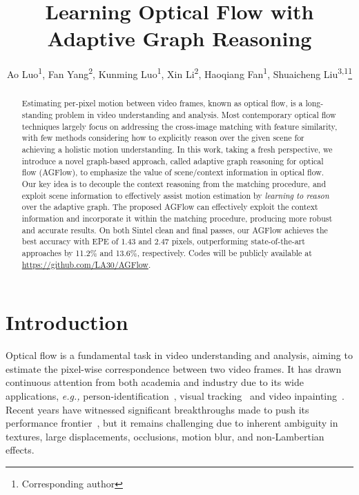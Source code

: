 \documentclass[letterpaper]{article} %
\title{Learning Optical Flow with Adaptive Graph Reasoning}
\author{
	Ao Luo\textsuperscript{\rm 1}, Fan Yang\textsuperscript{\rm 2}, Kunming Luo\textsuperscript{\rm 1}, Xin Li\textsuperscript{\rm 2}, Haoqiang Fan\textsuperscript{\rm 1}, Shuaicheng Liu\textsuperscript{\rm 3,1}\thanks{Corresponding author}\\
}
\begin{document}
\maketitle


\begin{abstract}
	
Estimating per-pixel motion between video frames, known as optical flow, is a long-standing problem in video understanding and analysis. Most contemporary optical flow techniques largely focus on addressing the cross-image matching with feature similarity, with few methods considering how to explicitly reason over the given scene for achieving a holistic motion understanding. In this work, taking a fresh perspective, we introduce a novel graph-based approach, called adaptive graph reasoning for optical flow (AGFlow), to emphasize the value of scene/context information in optical flow. Our key idea is to decouple the context reasoning from the matching procedure, and exploit scene information to effectively assist motion estimation by \emph{learning to reason} over the adaptive graph. The proposed AGFlow can effectively exploit the context information and incorporate it within the matching procedure, producing more robust and accurate results. On both Sintel clean and final passes, our AGFlow achieves the best accuracy with EPE of 1.43 and 2.47 pixels, outperforming state-of-the-art approaches by 11.2\% and 13.6\%, respectively. Codes will be publicly available at \url{https://github.com/LA30/AGFlow}.
	
\end{abstract}


\section{Introduction}

Optical flow is a fundamental task in video understanding and analysis, aiming to estimate the pixel-wise correspondence between two video frames. It has drawn continuous attention from both academia and industry due to its wide applications, \emph{e.g.,}  person-identification~\cite{chen2020frame}, visual tracking~\cite{vihlman2020optical} and video inpainting~\cite{Xu_2019_CVPR}. Recent years have witnessed significant breakthroughs made to push its performance frontier~\cite{Dosovitskiy2015FlowNetLO, Ilg2017FlowNet2E,Teed2020RAFTRA, Jiang2021LearningOF}, but it remains challenging due to inherent ambiguity in textures, large displacements, occlusions, motion blur, and non-Lambertian effects. 
\end{document}
